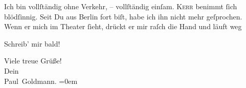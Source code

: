 \pstart
           {\pb}Ich bin vollſtändig ohne Verkehr, – vollſtändig
               einſam. \textsc{Kerr} benimmt{ }ſich blödſinnig. Seit Du aus Berlin
               fort biſt, habe ich ihn nicht mehr geſprochen. Wenn er mich im Theater{ }ſieht, drückt
               er mir raſch die Hand und läuft weg{\dotssix}\pend
           
\pstart
           Schreib’ mir bald!\pend
           
\pstart
           Viele treue Grüße! {\\[\baselineskip]}Dein {\\[\baselineskip]}\spacefill\mbox{Paul Goldmann.}\pend
           \leftskip=0em{}\endnumbering{}  \newcommand{\dateiname}{L03055}\newcommand{\titel}{Paul Goldmann an Arthur Schnitzler, 22. 1. [1901]}\newcommand{\editorInnen}{Martin Anton Müller und Laura Untner}
